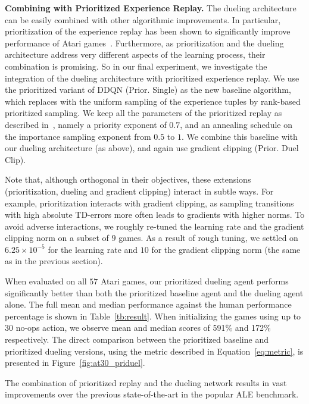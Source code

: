 {\bf Combining with Prioritized Experience Replay.}
\label{sec:prioritizedduel}
The dueling architecture can be easily combined with other algorithmic improvements. 
In particular, prioritization of the experience replay has been shown to significantly improve performance of Atari games~\cite{Schaul:2015}. 
Furthermore, as prioritization and the dueling architecture address very different aspects of the learning process, their combination is promising. 
So in our final experiment, we investigate the integration of the dueling architecture with prioritized experience replay.
We use the prioritized variant of DDQN (Prior. Single) as the new baseline algorithm, which replaces with the uniform sampling
of the experience tuples by rank-based prioritized sampling. 
We keep all the parameters of the prioritized replay as described in~\cite{Schaul:2015}, namely
a priority exponent of $0.7$, and an annealing schedule on the importance sampling exponent from $0.5$ to $1$.
We combine this baseline with our dueling architecture (as above), and again use gradient clipping (Prior. Duel Clip).

Note that, although orthogonal in their objectives, these extensions (prioritization, dueling and gradient clipping) interact in subtle ways. 
For example, prioritization interacts with gradient clipping, as sampling transitions with high absolute TD-errors more often leads to gradients with higher norms. 
To avoid adverse interactions, we roughly re-tuned the learning rate and the gradient clipping norm on a subset of $9$ games. As a result of rough tuning, we settled on $6.25 \times 10^{-5}$ for the learning rate and $10$ for the gradient clipping norm (the same as in the previous section).

When evaluated on all $57$ Atari games, our prioritized dueling agent performs significantly better than both the prioritized baseline agent and the dueling agent alone.
The full mean and median performance against the human performance percentage is shown in Table~\ref{tb:result}. When initializing the games using up to 30 no-ops action, we observe mean and median scores of 591\% and 172\% respectively.
The direct comparison between the prioritized baseline and prioritized dueling versions, using the metric described in Equation~\ref{eq:metric}, is presented in Figure~\ref{fig:at30_priduel}.

The combination of prioritized replay and the dueling network results in vast improvements over the previous state-of-the-art in the popular ALE benchmark.





